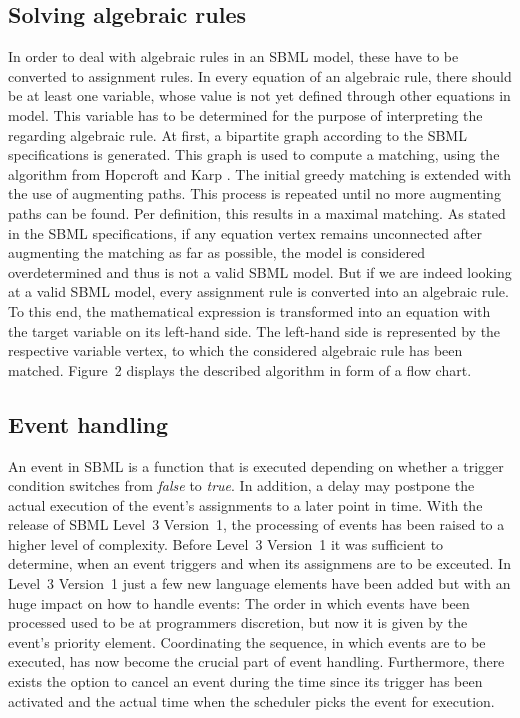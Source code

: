 \documentclass[10pt]{bmc_article}
\newenvironment{bmcformat}{\baselineskip20pt\sloppy\setboolean{publ}{false}}{\baselineskip20pt\sloppy}
\newcommand{\true}{\emph{true}}
\newcommand{\false}{\emph{false}}
\begin{document}
\begin{bmcformat}
\subsection*{Solving algebraic rules}
In order to deal with algebraic rules in an SBML model, these have to be converted to assignment rules.
In every equation of an algebraic rule, there should be at least one variable, 
whose value is not yet defined through other equations in model. This variable has to be determined 
for the purpose of interpreting the regarding algebraic rule. 
At first, a bipartite graph according to the SBML specifications is generated. This graph is used to 
compute a matching, using the algorithm from Hopcroft and Karp
\cite{hopcroft1973n}. The initial greedy matching is extended with the use of augmenting paths. This process is
repeated until no more augmenting paths can be found. Per definition, this results in a maximal matching. 
As stated in the SBML specifications, if any equation vertex remains unconnected after augmenting the 
matching as far as possible, the model is considered overdetermined and thus is not a valid SBML model. 
But if we are indeed looking at a valid SBML model, every assignment rule is converted into an algebraic rule. 
To this end, the mathematical expression is transformed into an equation with the target variable on its left-hand side.
The left-hand side is represented by the respective variable vertex, to which the considered algebraic rule has been matched.
Figure~2 displays the described algorithm in form of a flow chart.


\subsection*{Event handling}
An event in SBML is a function that is executed depending on whether a trigger condition switches from \false{} to
\true.
In addition, a delay may postpone the actual execution of the event's assignments to a later point in time.
With the release of SBML Level~3 Version~1, the processing of events has been raised to a higher level of complexity.
Before Level~3 Version~1 it was sufficient to determine, when an event triggers and when its assignmens are to be exceuted.
In Level~3 Version~1 just a few new language elements have been added but with an huge impact on how to handle events:
The order in which events have been processed used to be at programmers discretion, but now it is given by the event's priority element.
Coordinating the sequence, in which events are to be executed, has now become the crucial part of event handling. 
Furthermore, there exists the option to cancel an event during the time since its trigger 
has been activated and the actual time when the scheduler picks the event for execution.


\end{bmcformat}
\end{document}
